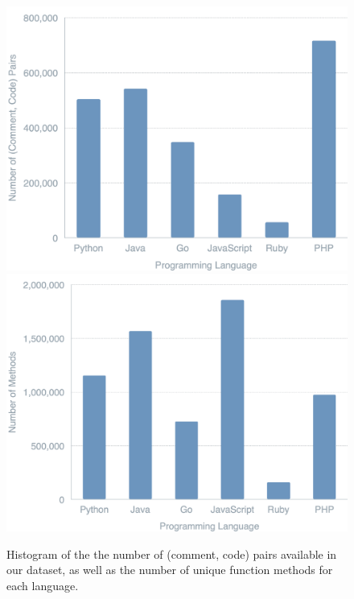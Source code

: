 \documentclass{article}
\begin{document}
\begin{figure}[!ht]
    \centering
    \includegraphics[scale=0.12]{figures/data_analysis/dist2.png}
    \includegraphics[scale=0.12]{figures/data_analysis/dists3.png}
    \caption{Histogram of the the number of (comment, code) pairs available in our dataset, as well as the number of unique function methods for each language.}
    \label{fig:dist_methods}
\end{figure}
\end{document}
